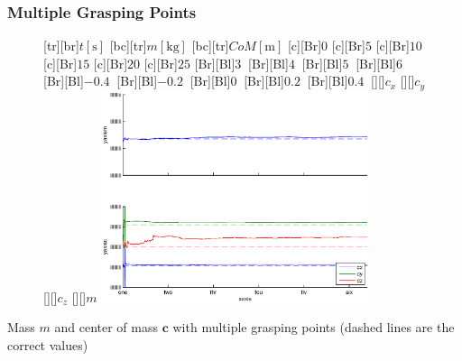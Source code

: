 \documentclass[student,noshadow]{ITRslides}
\renewcommand{\vec}[1]{\boldsymbol{#1}}
\renewcommand{\vec}[1]{\boldsymbol{#1}}
\begin{document}
\begin{frame}
	\frametitle{Multiple Grasping Points}
	\begin{center}
		\begin{figure}
			\centering	
			[tr][br]{$t\left[\mathrm{s}\right]$}
			[bc][tr]{$m\left[\mathrm{kg}\right]$}
			[bc][tr]{$CoM\left[\mathrm{m}\right]$}
			[c][Br]{$0$}
			[c][Br]{$5$}
			[c][Br]{$10$}
			[c][Br]{$15$}
			[c][Br]{$20$}
			[c][Br]{$25$}
			[Br][Bl]{$3\  $}
			[Br][Bl]{$4\ $}
			[Br][Bl]{$5\  $}
			[Br][Bl]{$6\  $}
			[Br][Bl]{$-0.4\  $}
			[Br][Bl]{$-0.2\ $}
			[Br][Bl]{$0\  $}
			[Br][Bl]{$0.2\  $}
			[Br][Bl]{$0.4\  $}
			[][]{\tiny $c_x$}
			[][]{\tiny $c_y$}
			[][]{\tiny $c_z$}
			[][]{\tiny $m$}
			\includegraphics[width=0.7\textwidth]{fig/multiple_grasping_points_human_mass_and_cog.eps}
		\end{figure}
		\vspace{0.2cm}
		Mass $m$ and center of mass $\vec{c}$ with multiple grasping points (dashed lines are the correct values)
	\end{center}
\end{frame}
\end{document}
